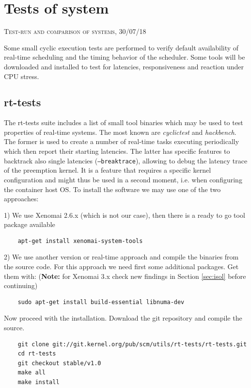 \documentclass[]{scrartcl}
\begin{document}
\section{Tests of system}

{\small\textsc{Test-run and comparison of systems, 30/07/18} \bigskip}

Some small cyclic execution tests are performed to verify default availability of real-time scheduling and the timing behavior of the scheduler. Some tools will be downloaded and installed to test for latencies, responsiveness and reaction under CPU stress. 

\subsection{rt-tests}

The rt-tests suite includes a list of small tool binaries which may be used to test properties of real-time systems. The most known are \textit{cyclictest} and \textit{hackbench}.
The former is used to create a number of real-time tasks executing periodically which then report their starting latencies. 
The latter has specific features to backtrack also single latencies (\texttt{--breaktrace}), allowing to debug the latency trace of the preemption kernel. It is a feature that requires a specific kernel configuration and might thus be used in a second moment, i.e. when configuring the container host OS. To install the software we may use one of the two approaches:

1) We use Xenomai 2.6.x (which is not our case), then there is a ready to go tool package available

\begin{verbatim}
	apt-get install xenomai-system-tools
\end{verbatim}

2) We use another version or real-time approach and compile the binaries from the source code.
For this approach we need first some additional packages. Get them with: (\textbf{Note:} for Xenomai 3.x check new findings in Section \ref{sec:isol} before continuing)

\begin{verbatim}
	sudo apt-get install build-essential libnuma-dev
\end{verbatim}

Now proceed with the installation. Download the git repository and compile the source.

\begin{verbatim}
	git clone git://git.kernel.org/pub/scm/utils/rt-tests/rt-tests.git
	cd rt-tests
	git checkout stable/v1.0
	make all
	make install
\end{verbatim}
\end{document}

